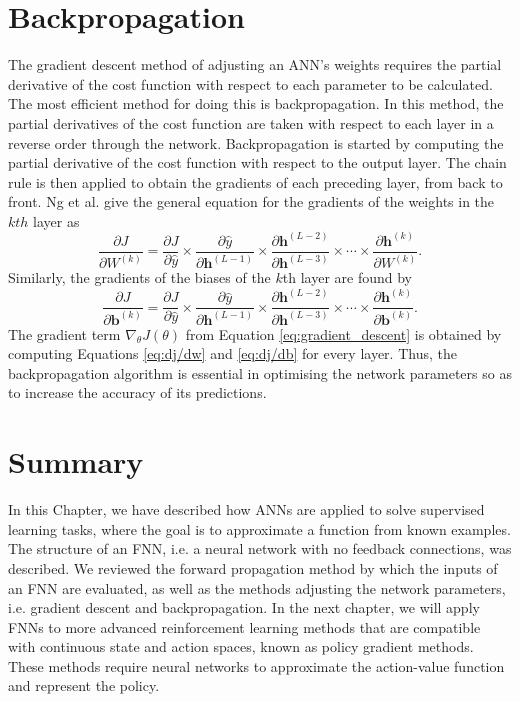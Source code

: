 \section{Backpropagation}
The gradient descent method of adjusting an ANN's weights requires the partial derivative of the cost function with respect to each parameter to be calculated.
The most efficient method for doing this is backpropagation.
In this method, the partial derivatives of the cost function are taken with respect to each layer in a reverse order through the network.
Backpropagation is started by computing the partial derivative of the cost function with respect to the output layer.
The chain rule is then applied to obtain the gradients of each preceding layer, from back to front.
Ng et al. \cite{Ng2019} give the general equation for the gradients of the weights in the $kth$ layer as
\begin{equation}\label{eq:dj/dw}
    \frac{\partial J}{\partial W^{(k)} } =  
    \frac{\partial J}{\partial \hat{y} } \times
    \frac{\partial \hat{y}}{\partial \mathbf{h}^{(L-1)} } \times 
    \frac{\partial \mathbf{h}^{(L-2)}}{\partial \mathbf{h}^{(L-3)} } \times \cdots \times
    \frac{\partial \mathbf{h}^{(k)}}{\partial  W^{(k)}}.
\end{equation}
Similarly, the gradients of the biases of the $k$th layer are found by
\begin{equation}\label{eq:dj/db}
    \frac{\partial J}{\partial \mathbf{b}^{(k)} } =  
    \frac{\partial J}{\partial \hat{y} } \times
    \frac{\partial \hat{y}}{\partial \mathbf{h}^{(L-1)} } \times 
    \frac{\partial \mathbf{h}^{(L-2)}}{\partial \mathbf{h}^{(L-3)} } \times \cdots \times
    \frac{\partial \mathbf{h}^{(k)}}{\partial  \mathbf{b}^{(k)}}.
\end{equation}
The gradient term $\nabla_{\theta}J(\theta)$ from Equation \ref{eq:gradient_descent} is obtained by computing Equations \ref{eq:dj/dw} and \ref{eq:dj/db} for every layer.
Thus, the backpropagation algorithm is essential in optimising the network parameters so as to increase the accuracy of its predictions.

\section{Summary}
In this Chapter, we have described how ANNs are applied to solve supervised learning tasks, where the goal is to approximate a function from known examples.
The structure of an FNN, i.e. a neural network with no feedback connections, was described.
We reviewed the forward propagation method by which the inputs of an FNN are evaluated, as well as the methods adjusting the network parameters, i.e. gradient descent and backpropagation.
In the next chapter, we will apply FNNs to more advanced reinforcement learning methods that are compatible with continuous state and action spaces, known as policy gradient methods.
These methods require neural networks to approximate the action-value function and represent the policy.


